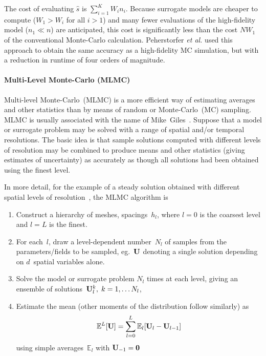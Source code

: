 The cost of evaluating $\hat{s}$ is $\sum_{i=1}^{K} W_in_i$.
Because surrogate models are cheaper to compute ($W_1>W_i$ for all $i>1$)
and many fewer evaluations of the high-fidelity model ($n_1\ll n$) are anticipated,
this cost is significantly less than the cost $NW_1$ of the conventional Monte-Carlo calculation.
Peherstorfer \emph{et al.} \cite{Pe16Opti} used this approach to obtain the same accuracy as a high-fidelity MC simulation, but with a reduction in runtime of four orders of magnitude.


\paragraph{Multi-Level Monte-Carlo (MLMC)}\label{sec:mlmc}
Multi-level Monte-Carlo~(MLMC) is a more efficient way of estimating averages
and other statistics than by means of random or Monte-Carlo~(MC) sampling. 
MLMC is usually associated with the name of Mike~Giles~\cite{Gi16Mult}.
Suppose that a model or surrogate problem may be solved with a range of
spatial and/or temporal resolutions. The basic idea is that sample solutions
computed with different levels of resolution may be combined to produce means
and other statistics 
(giving estimates of uncertainty) as accurately as though all solutions had been
obtained using the finest level.

In more detail, for the example of a steady solution obtained with
different spatial levels of resolution~\cite{Mi13Mult}, the MLMC algorithm is
\begin{enumerate}
\item Construct a hierarchy of meshes, spacings~$h_l$, where $l=0$ is the coarsest level
and $l=L$ is the finest.
\item For each~$l$, draw a level-dependent number~$N_l$ of samples from the parameters/fields
to be sampled, eg.\ 
${\bf U}$ denoting a single solution depending on $d$~spatial variables alone.
\item Solve the model or surrogate problem $N_l$ times at each level, giving an
ensemble of solutions~${\bf U}^k_l,\;k=1,\ldots N_l$,
\item Estimate the mean (other moments of the distribution follow similarly) as
\begin{equation}\label{eq:telescope}
{\mathbb E}^L[{\bf U}]= \sum_{l=0}^L {\mathbb E}_l[{\bf U}_l-{\bf U}_{l-1}]
\end{equation}
using simple averages~${\mathbb E}_l$ with ${\bf U}_{-1}={\bf 0}$
\end{enumerate}

